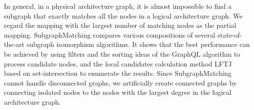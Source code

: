 \documentclass[runningheads]{llncs}
\begin{document}
In general, in a physical architecture graph, it is almost impossible to find a subgraph that exactly matches all the nodes in a logical architecture graph. We regard the mapping with the largest number of matching nodes as the partial mapping. SubgraphMatching compares various compositions of several state-of-the-art subgraph isomorphism algorithms.  
It shows that the best performance can be achieved by using filters and the sorting ideas of the GraphQL algorithm to process candidate nodes, and the local candidates calculation method LFTJ based on set-intersection to enumerate the results. Since SubgraphMatching cannot handle disconnected graphs, we artificially create connected graphs by connecting isolated nodes to the nodes with the largest degree in the logical architecture graph. %
\end{document}
